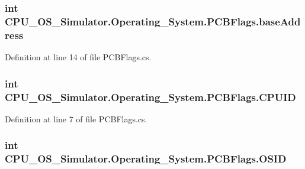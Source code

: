 \subsubsection[{base\+Address}]{\setlength{\rightskip}{0pt plus 5cm}int C\+P\+U\+\_\+\+O\+S\+\_\+\+Simulator.\+Operating\+\_\+\+System.\+P\+C\+B\+Flags.\+base\+Address}\label{struct_c_p_u___o_s___simulator_1_1_operating___system_1_1_p_c_b_flags_a11469ad59c9f9f3e36c95f8ae64f9c73}


Definition at line 14 of file P\+C\+B\+Flags.\+cs.

\hypertarget{struct_c_p_u___o_s___simulator_1_1_operating___system_1_1_p_c_b_flags_a15deeacce9002beb7f23aee161337daa}{}
\subsubsection[{C\+P\+U\+I\+D}]{\setlength{\rightskip}{0pt plus 5cm}int C\+P\+U\+\_\+\+O\+S\+\_\+\+Simulator.\+Operating\+\_\+\+System.\+P\+C\+B\+Flags.\+C\+P\+U\+I\+D}\label{struct_c_p_u___o_s___simulator_1_1_operating___system_1_1_p_c_b_flags_a15deeacce9002beb7f23aee161337daa}


Definition at line 7 of file P\+C\+B\+Flags.\+cs.

\hypertarget{struct_c_p_u___o_s___simulator_1_1_operating___system_1_1_p_c_b_flags_ac8d5b519b8ac16523a5ec55ab8817f46}{}
\subsubsection[{O\+S\+I\+D}]{\setlength{\rightskip}{0pt plus 5cm}int C\+P\+U\+\_\+\+O\+S\+\_\+\+Simulator.\+Operating\+\_\+\+System.\+P\+C\+B\+Flags.\+O\+S\+I\+D}\label{struct_c_p_u___o_s___simulator_1_1_operating___system_1_1_p_c_b_flags_ac8d5b519b8ac16523a5ec55ab8817f46}


